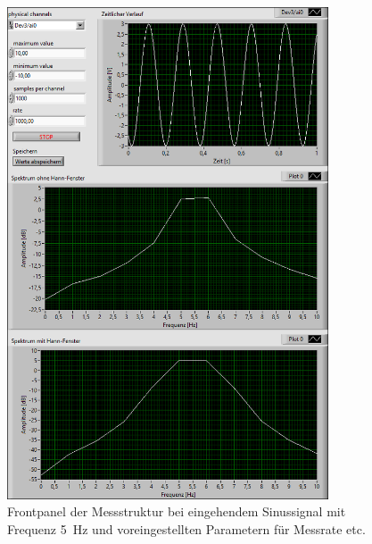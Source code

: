 		\begin{figure}[H]
			\centering
			\includegraphics[width=0.85\textwidth]{pic/abtast_5Hz.png}	
			\caption{Frontpanel der Messstruktur bei eingehendem Sinussignal mit Frequenz \SI{5}{\hertz} und voreingestellten Parametern für Messrate etc.}
			\label{fig:abtast_5Hz}
		\end{figure}
			
